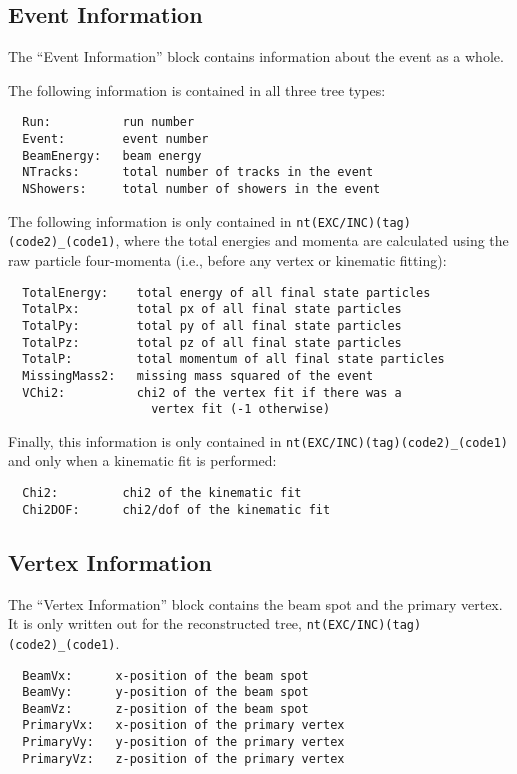 \documentclass[11pt,a4paper]{define/cepcnote}
\begin{document}
\subsection{Event Information}

The ``Event Information'' block contains information about the event as a whole.

The following information is contained in all three tree types:
\begin{verbatim}
  Run:          run number
  Event:        event number
  BeamEnergy:   beam energy
  NTracks:      total number of tracks in the event
  NShowers:     total number of showers in the event
\end{verbatim}
The following information is only contained in {\tt nt(EXC/INC)(tag)(code2)\_(code1)}, where the total energies and momenta are calculated using the raw particle four-momenta (i.e., before any vertex or kinematic fitting):
\begin{verbatim}
  TotalEnergy:    total energy of all final state particles
  TotalPx:        total px of all final state particles
  TotalPy:        total py of all final state particles
  TotalPz:        total pz of all final state particles
  TotalP:         total momentum of all final state particles
  MissingMass2:   missing mass squared of the event
  VChi2:          chi2 of the vertex fit if there was a
                    vertex fit (-1 otherwise)
\end{verbatim}
Finally, this information is only contained in {\tt nt(EXC/INC)(tag)(code2)\_(code1)} and only when a kinematic fit is performed:
\begin{verbatim}
  Chi2:         chi2 of the kinematic fit
  Chi2DOF:      chi2/dof of the kinematic fit
\end{verbatim}


\subsection{Vertex Information}

The ``Vertex Information'' block contains the beam spot and the primary vertex.  It is only written out for the reconstructed tree, {\tt nt(EXC/INC)(tag)(code2)\_(code1)}.

\begin{verbatim}
  BeamVx:      x-position of the beam spot
  BeamVy:      y-position of the beam spot
  BeamVz:      z-position of the beam spot
  PrimaryVx:   x-position of the primary vertex
  PrimaryVy:   y-position of the primary vertex
  PrimaryVz:   z-position of the primary vertex
\end{verbatim}
\end{document}
